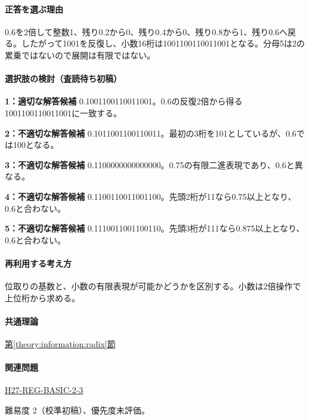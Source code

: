 \paragraph{正答を選ぶ理由} 0.6を2倍して整数1、残り0.2から0、残り0.4から0、残り0.8から1、残り0.6へ戻る。したがって1001を反復し、小数16桁は1001100110011001となる。分母5は2の累乗ではないので展開は有限ではない。

\paragraph{選択肢の検討（査読待ち初稿）}\mbox{}\par

\noindent\textbf{1：適切な解答候補} 0.1001100110011001。0.6の反復2倍から得る1001100110011001に一致する。\par

\noindent\textbf{2：不適切な解答候補} 0.1011001100110011。最初の3桁を101としているが、0.6では100となる。\par

\noindent\textbf{3：不適切な解答候補} 0.1100000000000000。0.75の有限二進表現であり、0.6と異なる。\par

\noindent\textbf{4：不適切な解答候補} 0.1100110011001100。先頭2桁が11なら0.75以上となり、0.6と合わない。\par

\noindent\textbf{5：不適切な解答候補} 0.1110011001100110。先頭3桁が111なら0.875以上となり、0.6と合わない。\par

\paragraph{再利用する考え方} 位取りの基数と、小数の有限表現が可能かどうかを区別する。小数は2倍操作で上位桁から求める。

\paragraph{共通理論} \hyperref[theory:information:radix]{第\ref*{theory:information:radix}節}

\paragraph{関連問題} \hyperref[q:h27-reg-basic-2-3]{H27-REG-BASIC-2-3}

\par 難易度 2（校準初稿）、優先度未評価。

